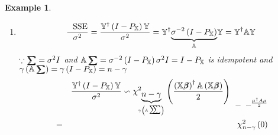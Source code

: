 \documentclass{article}
\newtheorem{example}[theorem]{Example}
\begin{document}
\begin{example}
\begin{enumerate}
\item 
\begin{equation*}
\frac{\text{SSE}}{\sigma ^{2}}=\frac{\mathbb{Y}^{\dagger }\left( I-P_{%
\mathbb{X}}\right) \mathbb{Y}}{\sigma ^{2}}=\mathbb{Y}^{\dagger }\underset{%
\mathbb{A}}{\underbrace{\sigma ^{-2}\left( I-P_{\mathbb{X}}\right) }}\mathbb{%
Y=Y}^{\dagger }\mathbb{AY}
\end{equation*}%
$\because 
\tsum\mkern-20mu\tsum%
=\sigma ^{2}I$ and $\mathbb{A}%
\tsum\mkern-20mu\tsum%
=\sigma ^{-2}\left( I-P_{\mathbb{X}}\right) \sigma ^{2}I=I-P_{\mathbb{X}}$
is idempotent and $\gamma \left( \mathbb{A}%
\tsum\mkern-20mu\tsum%
\right) =\gamma \left( I-P_{\mathbb{X}}\right) =n-\gamma $%
\begin{eqnarray*}
&\therefore &\frac{\mathbb{Y}^{\dagger }\left( I-P_{\mathbb{X}}\right) 
\mathbb{Y}}{\sigma ^{2}}\backsim \chi _{\underset{\gamma \left( \mathbb{A}%
\tsum\mkern-20mu\tsum%
\right) }{\underbrace{n-\gamma }}}^{2}\left( \frac{\left( \mathbb{X}%
\beta\mkern-9.6mu \beta%
\right) ^{\dagger }\mathbb{A}\left( \mathbb{X}%
\beta\mkern-9.6mu \beta%
\right) }{2}\right) _{\_\_\frac{\mu ^{\dagger }A\mu }{2}} \\
&=&\chi _{n-\gamma }^{2}\left( 0\right)
\end{eqnarray*}


\end{enumerate}
\end{example}
\end{document}
